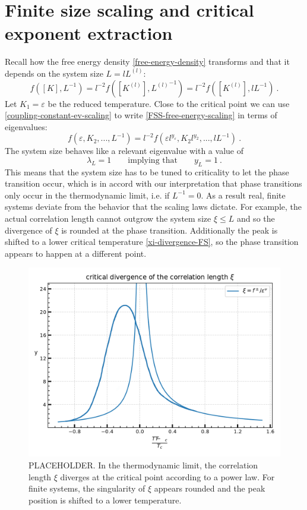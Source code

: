 	\section{Finite size scaling and critical exponent extraction} \label{Section::FSS}
	Recall how the free energy density \autoref{free-energy-density} transforms and that it depends on the system size $L = l L^{(l)}	$:
	\begin{equation}\label{FSS-free-energy-scaling}
		f\left([K], L^{-1}\right) =	l^{-2} f\left([K^{(l)}], {L^{(l)}}^{-1}\right) = l^{-2} f\left([K^{(l)}], l{L}^{-1}\right)	 ~.
	\end{equation}
	Let $K_1 =	\varepsilon$ be the reduced temperature. Close to the critical point we can use \autoref{coupling-constant-ev-scaling} to write \autoref{FSS-free-energy-scaling} in terms of eigenvalues:
	\begin{equation}
				f\left(\varepsilon, K_2, ..., L^{-1}\right) = l^{-2} f\left(\varepsilon l^{y_\varepsilon}, K_2 l^{y_2}, ..., l{L}^{-1}\right)	 ~.
	\end{equation} 
	The system size behaves like a relevant eigenvalue with a value of
	\begin{equation}
		\lambda_L =	1 \qquad \text{implying that} \qquad y_L =	1 ~.
	\end{equation}
	This means that the system size has to be tuned to criticality to let the phase transition occur, which is in accord with our interpretation that phase transitions only occur in the thermodynamic limit, i.e. if $L^{-1} =	0$. As a result real, finite systems deviate from the behavior that the scaling laws dictate. For example, the actual correlation length cannot outgrow the system size $\xi \leq L$ and so the divergence of $\xi$ is rounded at the phase transition. Additionally the peak is shifted to a lower critical temperature \autoref{xi-divergence-FS}, so the phase transition appears to happen at a different point. \\
	\begin{figure}[htp]
		\centering
		\includegraphics[width=0.7\linewidth]{graphics/xi-divergence-FS.png}
		\caption{PLACEHOLDER. In the thermodynamic limit, the correlation length $\xi$ diverges at the critical point according to a power law. For finite systems, the singularity of $\xi$ appears rounded and the peak position is shifted to a lower temperature.}
		\label{xi-divergence-FS}
	\end{figure} \\
